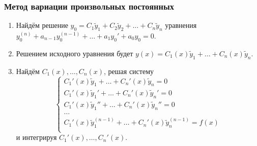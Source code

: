 \subsubsection{Метод вариации произвольных постоянных}
\begin{enumerate}
	\item Найдём решение $y_0 = C_1 \tilde y_1 + C_2 \tilde y_2 + \ldots + C_n \tilde y_n$ уравнения $y_0^{(n)} + a_{n-1} y_0^{(n-1)} + \ldots + a_1 y_0' + a_0 y_0 = 0$.
	
	\item Решением исходного уравнения будет $y(x) = C_1(x) \tilde y_1 + \ldots + C_n(x) \tilde y_n$.
	
	\item Найдём $C_1(x), \ldots, C_n(x)$, решая систему
	\begin{equation*}
	\begin{cases}
	C_1'(x) \tilde y_1 + \ldots + C_n'(x) \tilde y_n = 0 \\
	C_1'(x) \tilde y_1' + \ldots + C_n'(x) \tilde y_n' = 0 \\
	C_1'(x) \tilde y_1'' + \ldots + C_n'(x) \tilde y_n'' = 0 \\
	\ldots \\
	C_1'(x) \tilde y_1^{(n-1)} + \ldots + C_n'(x) \tilde y_n^{(n-1)} = f(x) \\
	\end{cases}
	\end{equation*}
	и интегрируя $C_1'(x), \ldots, C_n'(x)$.
\end{enumerate}

